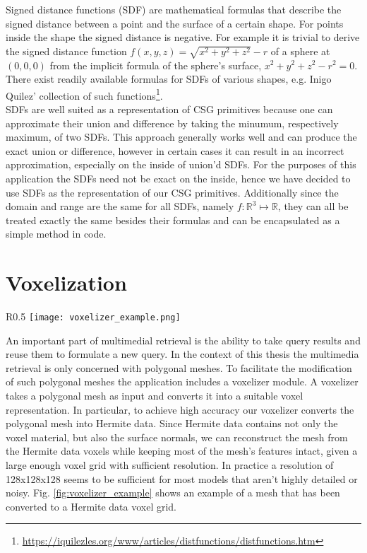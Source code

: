 Signed distance functions (SDF) are mathematical formulas that describe the signed distance between a point and the surface of a certain shape. For points inside the shape the
signed distance is negative. For example it is trivial to derive the signed distance function $f(x,y,z) = \sqrt{x^2 + y^2 + z^2} - r$ of a sphere at $(0, 0, 0)$ from the implicit formula of the sphere's surface, $x^2 + y^2 + z^2 - r^2 = 0$. There exist readily available formulas for SDFs of various shapes, e.g. Inigo Quilez' collection of such functions\footnote{\url{https://iquilezles.org/www/articles/distfunctions/distfunctions.htm}}.\\
SDFs are well suited as a representation of CSG primitives because one can approximate their union and difference by taking the minumum, respectively maximum, of two SDFs. This approach generally works
well and can produce the exact union or difference, however in certain cases it can result in an incorrect approximation, especially on the inside of union'd SDFs. For the purposes of this application the
SDFs need not be exact on the inside, hence we have decided to use SDFs as the representation of our CSG primitives. Additionally since the domain and range are the same for all SDFs, namely
$f\colon \mathbb{R}^3 \mapsto \mathbb{R}$, they can all be treated exactly the same besides their formulas and can be encapsulated as a simple method in code.

\section{Voxelization}

\begin{wrapfigure}{R}{0.5\textwidth}
\texttt{[image: voxelizer\_example.png]}
\caption{The Stanford Armadillo mesh\protect\footnotemark  (left) and its voxel representation at a resolution of 128x128x128 voxels (right).}
\label{fig:voxelizer_example}
\end{wrapfigure}

An important part of multimedial retrieval is the ability to take query results and reuse them to formulate a new query. In the context of this thesis the multimedia retrieval
is only concerned with polygonal meshes. To facilitate the modification of such polygonal meshes the application includes a voxelizer module. A voxelizer takes a polygonal
mesh as input and converts it into a suitable voxel representation. In particular, to achieve high accuracy our voxelizer converts the polygonal mesh into Hermite data. Since
Hermite data contains not only the voxel material, but also the surface normals, we can reconstruct the mesh from the Hermite data voxels while keeping most of the mesh's features intact, given
a large enough voxel grid with sufficient resolution. In practice a resolution of 128x128x128 seems to be sufficient for most models that aren't highly detailed or noisy.
Fig. \ref{fig:voxelizer_example} shows an example of a mesh that has been converted to a Hermite data voxel grid.

